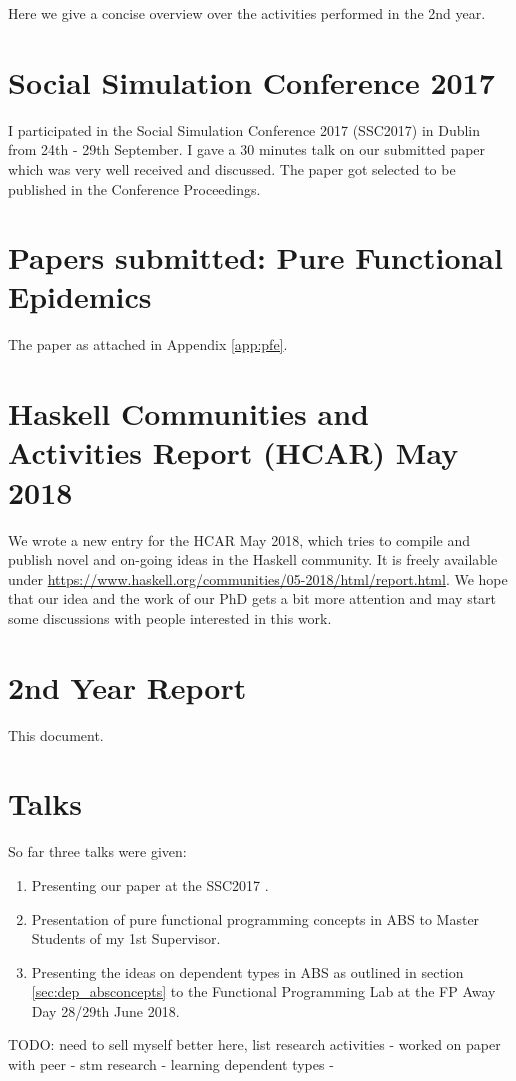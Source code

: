 Here we give a concise overview over the activities performed in the 2nd year.

\section{Social Simulation Conference 2017}
I participated in the Social Simulation Conference 2017 (SSC2017) in Dublin from 24th - 29th September. I gave a 30 minutes talk on our submitted paper \cite{thaler_art_2017} which was very well received and discussed. The paper got selected to be published in the Conference Proceedings.

\section{Papers submitted: Pure Functional Epidemics}
The paper as attached in Appendix \ref{app:pfe}.

\section{Haskell Communities and Activities Report (HCAR) May 2018}
We wrote a new entry for the HCAR May 2018, which tries to compile and publish novel and on-going ideas in the Haskell community. It is freely available under \url{https://www.haskell.org/communities/05-2018/html/report.html}. We hope that our idea and the work of our PhD gets a bit more attention and may start some discussions with people interested in this work.

\section{2nd Year Report}
This document.

\section{Talks}
So far three talks were given:

\begin{enumerate}
	\item Presenting our paper \cite{thaler_art_2017} at the SSC2017 .
	\item Presentation of pure functional programming concepts in ABS to Master Students of my 1st Supervisor.
	\item Presenting the ideas on dependent types in ABS as outlined in section \ref{sec:dep_absconcepts} to the Functional Programming Lab at the FP Away Day 28/29th June 2018.
\end{enumerate} 

TODO: need to sell myself better here, list research activities
- worked on paper with peer
- stm research
- learning dependent types
- 